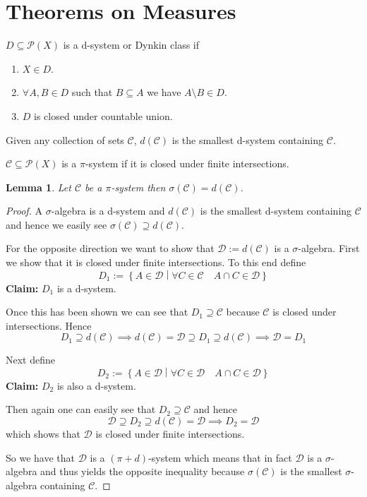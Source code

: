 \documentclass[11pt]{article}
\newcommand{\defeq}{:=}
\newcommand{\relmiddle}[1]{\mathrel{}\middle#1\mathrel{}}
\newcommand{\rmv}{\relmiddle|}
\newenvironment{defin}
	{\begin{mdframed}[backgroundcolor=white, roundcorner=5pt, linewidth=1pt]}
	{\end{mdframed}}
\newcommand{\mdf}[1]{{\color{red} #1}}
\newtheorem{lemma}[theorem]{Lemma}
\begin{document}
\section{Theorems on Measures}
\begin{defin}
	$D\subseteq\mathcal{P}(X)$ is a \mdf{d-system} or \mdf{Dynkin class} if
	\begin{enumerate}[label=(\alph*)]
		\item $X\in D$.
		\item $\forall A, B \in D$ such that $B\subseteq A$ we have $A\setminus B\in D$.
		\item $D$ is closed under countable union.
	\end{enumerate}
	Given any collection of sets $\mathcal{C}$, \mdf{$d(\mathcal{C})$} is the smallest d-system containing $\mathcal{C}$.

	$\mathcal{C}\subseteq\mathcal{P}(X)$ is a \mdf{$\pi$-system} if it is closed under finite intersections.
\end{defin}
\begin{lemma}
Let $\mathcal{C}$ be a $\pi$-system then $\sigma(\mathcal{C})=d(\mathcal{C})$.
\end{lemma}

\begin{proof}
A $\sigma$-algebra is a d-system and $d(\mathcal{C})$ is the smallest d-system containing $\mathcal{C}$ and hence we easily see $\sigma(\mathcal{C})\supseteq d(\mathcal{C})$.

For the opposite direction we want to show that $\mathcal{D}\defeq d(\mathcal{C})$ is a $\sigma$-algebra.
First we show that it is closed under finite intersections.
To this end define 
\[
	D_1\defeq \left\{A\in\mathcal{D} \rmv \forall C \in \mathcal{C}\quad A\cap C \in\mathcal{D}\right\}
\]
\textbf{Claim: }$D_1$ is a d-system.

Once this has been shown we can see that $D_1\supseteq\mathcal{C}$ because $\mathcal{C}$ is closed under intersections. Hence
\[
	D_1\supseteq d(\mathcal{C}) \implies d(\mathcal{C})=\mathcal{D}\supseteq D_1 \supseteq d(\mathcal{C}) \implies \mathcal{D}=D_1
\]

Next define 
\[
	D_2\defeq\left\{A\in\mathcal{D} \rmv \forall C\in\mathcal{D} \quad A\cap C\in\mathcal{D} \right\}
\]
\textbf{Claim: }$D_2$ is also a d-system.

Then again one can easily see that $D_2\supseteq\mathcal{C}$ and hence
\[
	\mathcal{D}\supseteq D_2 \supseteq d(\mathcal{C}) = \mathcal{D} \implies D_2 = \mathcal{D}
\]
which shows that $\mathcal{D}$ is closed under finite intersections.

So we have that $\mathcal{D}$ is a $(\pi+d)$-system which means that in fact $\mathcal{D}$ is a $\sigma$-algebra and thus yields the opposite inequality because $\sigma(\mathcal{C})$ is the smallest $\sigma$-algebra containing $\mathcal{C}$.
\end{proof}
\end{document}
